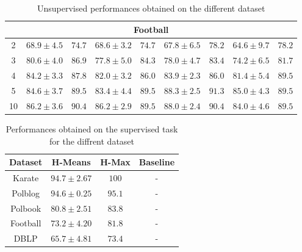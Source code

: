 \documentclass{article}
\begin{document}
\begin{table}
\begin{tabular}{|c|cccc|cccc|}
        \hline
        \multicolumn{9}{|c|}{Football} \\
        \hline
        2&$68.9 \pm 4.5$&$74.7$&$68.6 \pm 3.2$&$74.7$&$67.8 \pm 6.5$&$78.2$&$64.6 \pm9.7$&$78.2$\\ \hline
        3&$80.6 \pm 4.0$&$86.9$&$77.8 \pm 5.0$&$84.3$&$78.0 \pm 4.7$&$83.4$&$74.2 \pm6.5$&$81.7$\\ \hline
        4&$84.2 \pm 3.3$&$87.8$&$82.0 \pm 3.2$&$86.0$&$83.9 \pm 2.3$&$86.0$&$81.4 \pm5.4$&$89.5$\\ \hline
        5&$84.6 \pm 3.7$&$89.5$&$83.4 \pm 4.4$&$89.5$&$88.3 \pm 2.5$&$91.3$&$85.0 \pm4.3$&$89.5$\\ \hline
        10&$86.2 \pm 3.6$&$90.4$&$86.2 \pm 2.9$&$89.5$&$88.0 \pm 2.4$&$90.4$&$84.0 \pm4.6$&$89.5$\\ \hline


  \end{tabular}
  \caption{Unsupervised performances obtained on the different dataset}
\end{table}

\begin{table}
    \begin{tabular}{|c|cc|c|}
        \hline
        Dataset & H-Means & H-Max & Baseline \\
        \hline
        Karate & $94.7\pm2.67$ & $100$ & - \\
        Polblog & $94.6\pm0.25$ & $95.1$ & - \\
        Polbook & $80.8 \pm 2.51$ & $83.8$ & - \\
        Football & $73.2 \pm 4.20$ & $81.8$ & - \\
        DBLP & $65.7\pm4.81$& $73.4$ & - \\

        \hline
    \end{tabular}
    \centering
    \caption{Performances obtained on the supervised task for the diffrent dataset}
\end{table}
\end{document}
